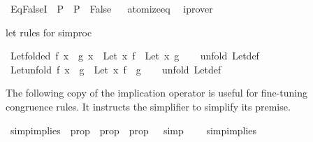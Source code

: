 \begin{isabellebody}
\endisatagproof
{\isafoldproof}%
%
\isadelimproof
%
\endisadelimproof
\isanewline
{}\isamarkupfalse%
\ Eq{\isacharunderscore}{\kern0pt}FalseI{\isacharcolon}{\kern0pt}\ {\isachardoublequoteopen}{\isasymnot}\ P\ {\isasymLongrightarrow}\ P\ {\isasymequiv}\ False{\isachardoublequoteclose}%
\isadelimproof
\ %
\endisadelimproof
%
\isatagproof
{}\isamarkupfalse%
\ atomize{\isacharunderscore}{\kern0pt}eq\ \isamarkupfalse%
\ iprover%
\endisatagproof
{\isafoldproof}%
%
\isadelimproof
%
\endisadelimproof
%
\begin{isamarkuptext}%
\medskip let rules for simproc%
\end{isamarkuptext}\isamarkuptrue%
\isamarkupfalse%
\ Let{\isacharunderscore}{\kern0pt}folded{\isacharcolon}{\kern0pt}\ {\isachardoublequoteopen}f\ x\ {\isasymequiv}\ g\ x\ {\isasymLongrightarrow}\ Let\ x\ f\ {\isasymequiv}\ Let\ x\ g{\isachardoublequoteclose}\isanewline
%
\isadelimproof
\ \ %
\endisadelimproof
%
\isatagproof
{}\isamarkupfalse%
\ {\isacharparenleft}{\kern0pt}unfold\ Let{\isacharunderscore}{\kern0pt}def{\isacharparenright}{\kern0pt}%
\endisatagproof
{\isafoldproof}%
%
\isadelimproof
\isanewline
%
\endisadelimproof
\isanewline
{}\isamarkupfalse%
\ Let{\isacharunderscore}{\kern0pt}unfold{\isacharcolon}{\kern0pt}\ {\isachardoublequoteopen}f\ x\ {\isasymequiv}\ g\ {\isasymLongrightarrow}\ Let\ x\ f\ {\isasymequiv}\ g{\isachardoublequoteclose}\isanewline
%
\isadelimproof
\ \ %
\endisadelimproof
%
\isatagproof
{}\isamarkupfalse%
\ {\isacharparenleft}{\kern0pt}unfold\ Let{\isacharunderscore}{\kern0pt}def{\isacharparenright}{\kern0pt}%
\endisatagproof
{\isafoldproof}%
%
\isadelimproof
%
\endisadelimproof
%
\begin{isamarkuptext}%
The following copy of the implication operator is useful for
  fine-tuning congruence rules.  It instructs the simplifier to simplify
  its premise.%
\end{isamarkuptext}\isamarkuptrue%
\isamarkupfalse%
\ simp{\isacharunderscore}{\kern0pt}implies\ {\isacharcolon}{\kern0pt}{\isacharcolon}{\kern0pt}\ {\isachardoublequoteopen}prop\ {\isasymRightarrow}\ prop\ {\isasymRightarrow}\ prop{\isachardoublequoteclose}\ \ {\isacharparenleft}{\kern0pt}\ {\isachardoublequoteopen}{\isacharequal}{\kern0pt}simp{\isacharequal}{\kern0pt}{\isachargreater}{\kern0pt}{\isachardoublequoteclose}\ {}{\isacharparenright}{\kern0pt}\isanewline
\ \ \ {\isachardoublequoteopen}simp{\isacharunderscore}{\kern0pt}implies\ {\isasymequiv}\ {\isacharparenleft}{\kern0pt}{\isasymLongrightarrow}{\isacharparenright}{\kern0pt}{\isachardoublequoteclose}\isanewline

\end{isabellebody}
